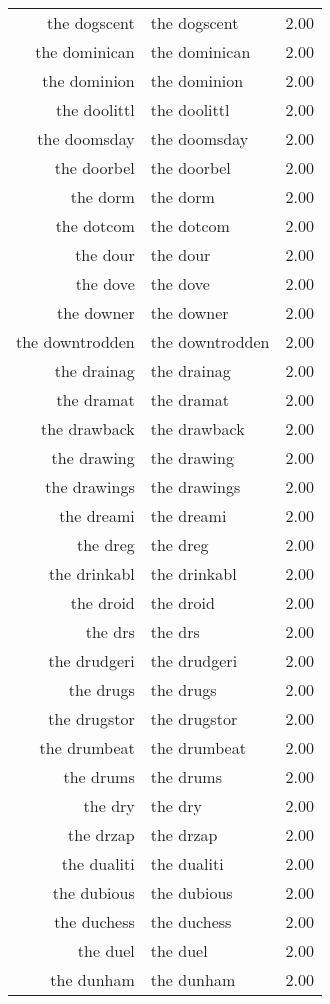 \begin{table}[ht]
\begin{tabular}{rlr}
  the dogscent & the dogscent & 2.00 \\ 
  the dominican & the dominican & 2.00 \\ 
  the dominion & the dominion & 2.00 \\ 
  the doolittl & the doolittl & 2.00 \\ 
  the doomsday & the doomsday & 2.00 \\ 
  the doorbel & the doorbel & 2.00 \\ 
  the dorm & the dorm & 2.00 \\ 
  the dotcom & the dotcom & 2.00 \\ 
  the dour & the dour & 2.00 \\ 
  the dove & the dove & 2.00 \\ 
  the downer & the downer & 2.00 \\ 
  the downtrodden & the downtrodden & 2.00 \\ 
  the drainag & the drainag & 2.00 \\ 
  the dramat & the dramat & 2.00 \\ 
  the drawback & the drawback & 2.00 \\ 
  the drawing & the drawing & 2.00 \\ 
  the drawings & the drawings & 2.00 \\ 
  the dreami & the dreami & 2.00 \\ 
  the dreg & the dreg & 2.00 \\ 
  the drinkabl & the drinkabl & 2.00 \\ 
  the droid & the droid & 2.00 \\ 
  the drs & the drs & 2.00 \\ 
  the drudgeri & the drudgeri & 2.00 \\ 
  the drugs & the drugs & 2.00 \\ 
  the drugstor & the drugstor & 2.00 \\ 
  the drumbeat & the drumbeat & 2.00 \\ 
  the drums & the drums & 2.00 \\ 
  the dry & the dry & 2.00 \\ 
  the drzap & the drzap & 2.00 \\ 
  the dualiti & the dualiti & 2.00 \\ 
  the dubious & the dubious & 2.00 \\ 
  the duchess & the duchess & 2.00 \\ 
  the duel & the duel & 2.00 \\ 
  the dunham & the dunham & 2.00 \\ 

\end{tabular}
\end{table}
